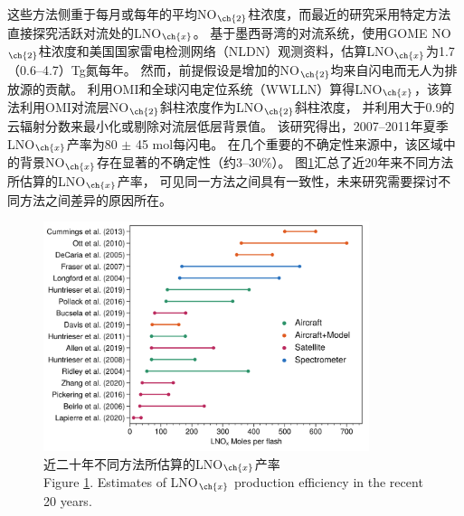 这些方法侧重于每月或每年的平均NO$_{\ch{2}}$柱浓度，而最近的研究采用特定方法直接探究活跃对流处的LNO$_{\ch{x}}$。
\citet{Beirle.2006}基于墨西哥湾的对流系统，使用GOME NO$_{\ch{2}}$柱浓度和美国国家雷电检测网络（NLDN）观测资料，估算LNO$_{\ch{x}}$为1.7（0.6–4.7）Tg氮每年。
然而，前提假设是增加的NO$_{\ch{2}}$均来自闪电而无人为排放源的贡献。
\citet{Pickering.2016} 利用OMI和全球闪电定位系统（WWLLN）算得LNO$_{\ch{x}}$，该算法利用OMI对流层NO$_{\ch{2}}$斜柱浓度作为LNO$_{\ch{2}}$斜柱浓度，
并利用大于0.9的云辐射分数来最小化或剔除对流层低层背景值。
该研究得出，2007--2011年夏季LNO$_{\ch{x}}$产率为80 $\pm$ 45 mol每闪电。
在几个重要的不确定性来源中，该区域中的背景NO$_{\ch{x}}$存在显著的不确定性（约3--30\%）。
图\ref{figure:lnox_production_xin}汇总了近20年来不同方法所估算的LNO$_{\ch{x}}$产率，
可见同一方法之间具有一致性，未来研究需要探讨不同方法之间差异的原因所在。

\begin{figure}[H]
\centering
\includegraphics[width=0.85\textwidth]{./figures/lnox_production_xin.png}
\caption{近二十年不同方法所估算的LNO$_{\ch{x}}$产率\\
Figure \ref{figure:lnox_production_xin}. Estimates of LNO$_{\ch{x}}$ production efficiency in the recent 20 years.}
\label{figure:lnox_production_xin}
\end{figure}

